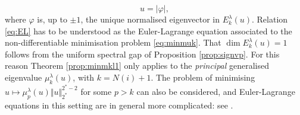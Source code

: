 \documentclass[10pt]{amsart}
\numberwithin{equation}{section}
\newcommand{\vp}{\varphi}
\newcommand{\mkl}{\mu_{k}^{\lambda}}
\theoremstyle{plain}
\theoremstyle{remark}
\begin{document}
\begin{equation} \label{eq:EL}
 u = |\vp|, 
 \end{equation}
where $\vp$ is, up to $\pm1$, the unique normalised eigenvector in $E_{k}^{\lambda}(u)$. Relation \eqref{eq:EL} has to be understood as the Euler-Lagrange equation associated to the non-differentiable minimisation problem \eqref{eq:minmuk}. That $\dim E_k^{\lambda}(u) = 1$ follows from the uniform spectral gap of Proposition \ref{prop:signvp}. For this reason Theorem \ref{prop:minmkl1} only applies to the \emph{principal} generalised eigenvalue $\mkl(u)$, with $k = N(i)+1$. The problem of minimising $u \mapsto \mu_p^{\lambda}(u) \Vert u \Vert_{2^*}^{2^*-2}$ for some $p > k$ can also be considered, and Euler-Lagrange equations in this setting are in general more complicated: see \cite{HumbertPetridesPremoselli}. 

\medskip
\end{document}
